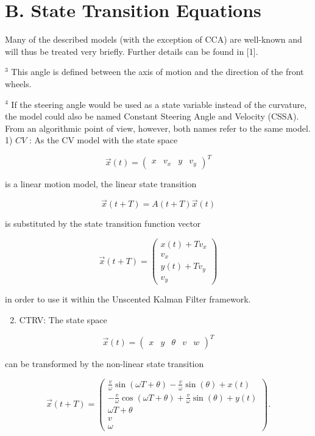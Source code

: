 \section{B. State Transition Equations}
Many of the described models (with the exception of CCA) are well-known and will thus be treated very briefly. Further details can be found in [1].

${ }^{3}$ This angle is defined between the axis of motion and the direction of the front wheels.

${ }^{4}$ If the steering angle would be used as a state variable instead of the curvature, the model could also be named Constant Steering Angle and Velocity (CSSA). From an algorithmic point of view, however, both names refer to the same model. 1) $C V$ : As the CV model with the state space

$$
\vec{x}(t)=\left(\begin{array}{cccc}
	x & v_{x} & y & v_{y}
\end{array}\right)^{T}
$$

is a linear motion model, the linear state transition

$$
\vec{x}(t+T)=A(t+T) \vec{x}(t)
$$

is substituted by the state transition function vector

$$
\vec{x}(t+T)=\left(\begin{array}{c}
	x(t)+T v_{x} \\
	v_{x} \\
	y(t)+T v_{y} \\
	v_{y}
\end{array}\right)
$$

in order to use it within the Unscented Kalman Filter framework.

\begin{enumerate}
	\setcounter{enumi}{1}
	\item CTRV: The state space
\end{enumerate}

$$
\vec{x}(t)=\left(\begin{array}{ccccc}
	x & y & \theta & v & w
\end{array}\right)^{T}
$$

can be transformed by the non-linear state transition

$$
\vec{x}(t+T)=\left(\begin{array}{c}
	\frac{v}{\omega} \sin (\omega T+\theta)-\frac{v}{\omega} \sin (\theta)+x(t) \\
	-\frac{v}{\omega} \cos (\omega T+\theta)+\frac{v}{\omega} \sin (\theta)+y(t) \\
	\omega T+\theta \\
	v \\
	\omega
\end{array}\right) .
$$

